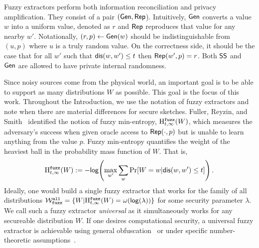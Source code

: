   Fuzzy extractors perform both information reconciliation and privacy amplification.  They consist of a pair $({\mathsf{Gen}}, {\mathsf{Rep}}$).  Intuitively, ${\mathsf{Gen}}$ converts a value $w$ into a uniform value, denoted as $r$ and ${\mathsf{Rep}}$ reproduces that value for any nearby $w'$.  Notationally, $(r, p)\leftarrow {\ensuremath{\mathsf{Gen}}}(w)$ should be indistinguishable from $(u, p)$ where $u$ is a truly random value.  On the correctness side, it should be the case that for all $w'$ such that $\mathsf{dis}(w, w')\le t$ then ${\mathsf{Rep}}(w', p) =r$.  
  Both ${\mathsf{SS}}$ and ${\mathsf{Gen}}$ are allowed to have private internal randomness.  
  
  
Since noisy sources come from the physical world, an important goal
  is to be able to support as many distributions $W$ as possible. This goal is the focus of this work. 
  Throughout the Introduction, we use the notation of fuzzy extractors
  and note when there are material differences for secure sketches.
  Fuller, Reyzin, and Smith~\cite{fuller2016fuzzy,fuller2020fuzzy}
  identified the notion of fuzzy min-entropy, $\mathrm{H}^{\mathtt{fuzz}}_{t,\infty}(W)$, which
  measures the adversary's success when given oracle access to
  ${\mathsf{Rep}}(\cdot, p)$ but is unable to learn anything from the value $p$.
Fuzzy min-entropy quantifies the weight of the heaviest ball
  in the probability mass function of $W$.  That is,
\[
\mathrm{H}^{\mathtt{fuzz}}_{t,\infty}(W):= -\mathsf{log}\!\left(\max_{w'} \sum_{w } \Pr[W=w | \mathsf{dis}(w, w')\le t]\right).
\]Ideally, one would build a single fuzzy extractor that works for the family of all distributions $\mathcal{W}_{\mathtt{fuzz}}^{\mathtt{all}} = \{ W | \mathrm{H}^{\mathtt{fuzz}}_{t,\infty}(W) = \omega(\mathsf{log}\!\left(\lambda\right))\}$ for some security parameter $\lambda$.  We call such a fuzzy extractor \emph{universal} as it simultaneously works for any secureable distribution $W$. 
If one desires computational security, a universal fuzzy extractor is achievable using general obfuscation~\cite{BarakBCKPS13,BitanskyCKP14,bitansky2017virtual} or under specific number-theoretic assumptions~\cite{galbraith2019obfuscated}. 


